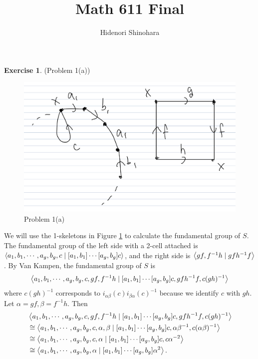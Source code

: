 \documentclass[12pt, psamsfonts]{amsart}
\theoremstyle{definition}
\newtheorem*{exer}{Exercise}
\theoremstyle{remark}
\numberwithin{equation}{section}
\begin{document}
\title{Math 611 Final}
\author{Hidenori Shinohara}
\maketitle


\begin{exer}{(Problem 1(a))}
  \begin{figure}[!htb]
    \includegraphics[width=.7\linewidth]{problem1_a.jpeg}
    \caption{Problem 1(a)}
    \label{fig:problem1a}
  \end{figure}
  We will use the 1-skeletons in Figure \ref{fig:problem1a} to calculate the fundamental group of $S$.
  The fundamental group of the left side with a 2-cell attached is $\ev{a_1, b_1, \cdots, a_g, b_g, c \mid [a_1, b_1] \cdots [a_g, b_g]c}$, and the right side is $\ev{gf, f^{-1}h \mid gfh^{-1}f}$.
  By Van Kampen, the fundamental group of $S$ is 
  \begin{align*}
    \ev{ a_1, b_1, \cdots, a_g, b_g, c, gf, f^{-1}h \mid [a_1, b_1] \cdots [a_g, b_g]c, gfh^{-1}f, c(gh)^{-1}}
  \end{align*}
  where $c(gh)^{-1}$ corresponds to $i_{\alpha\beta}(c)i_{\beta\alpha}(c)^{-1}$ because we identify $c$ with $gh$.
  Let $\alpha = gf, \beta = f^{-1}h$.
  Then
  \begin{align*}
    &\ev{ a_1, b_1, \cdots, a_g, b_g, c, gf, f^{-1}h \mid [a_1, b_1] \cdots [a_g, b_g]c, gfh^{-1}f, c(gh)^{-1}} \\
    &\cong \ev{ a_1, b_1, \cdots, a_g, b_g, c, \alpha, \beta \mid [a_1, b_1] \cdots [a_g, b_g]c, \alpha\beta^{-1}, c(\alpha\beta)^{-1}} \\
    &\cong \ev{ a_1, b_1, \cdots, a_g, b_g, c, \alpha \mid [a_1, b_1] \cdots [a_g, b_g]c, c\alpha^{-2}} \\
    &\cong \ev{ a_1, b_1, \cdots, a_g, b_g, \alpha \mid [a_1, b_1] \cdots [a_g, b_g]\alpha^2}.
  \end{align*}
\end{exer}
\end{document}
